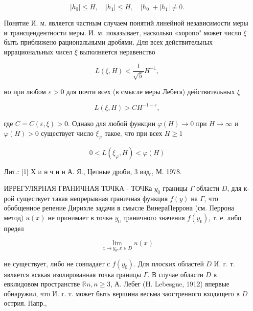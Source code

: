 \documentclass[10pt]{article}
\begin{document}
\[

\left|h_{0}\right| \leqslant H, \quad\left|h_{1}\right| \leqslant H, \quad\left|h_{0}\right|+\left|h_{1}\right| \neq 0 .

\]



Понятие И. м. является частным случаем понятий линейной независимости меры и трансцендентности меры. И. м. показывает, насколько «хоропо" может число $\xi$ быть приближено рациональными дробями. Для всех действительных иррациональных чисел $\xi$ выполняется неравенство



\[

L(\xi, H)<\frac{1}{\sqrt{5}} H^{-1},

\]



но при любом $\varepsilon>0$ для почти всех (в смысле меры Лебега) действительных $\xi$



\[

L(\xi, H)>C H^{-1-\varepsilon},

\]



где $C=C(\varepsilon, \xi)>0$. Однако для любой функции $\varphi(H) \rightarrow 0$ при $H \rightarrow \infty$ и $\varphi(H)>0$ существует число $\xi_{\varphi}$ такое, что при всех $H \geqslant 1$



\[

0<L\left(\xi_{\varphi}, H\right)<\varphi(H)

\]



Лит.: [1] Х и н ч и н А. Я., Цепные дроби, 3 изд., М. 1978.



ИРРЕГУЛЯРНАЯ ГРАНИЧНАЯ ТОЧКА - ТОЧКа $y_{0}$ границы $\Gamma$ области $D$, для к-рой существует такая непрерывная граничная функция $f(y)$ на $\Gamma$, что обобщенное репение Дирихле задачи в смысле ВинераПеррона (см. Перрона метод) $u(x)$ не принимает в точкө $y_{0}$ граничного значения $f\left(y_{0}\right)$, т. е. либо предел



\[

\lim _{x \rightarrow y_{0}, x \in D} u(x)

\]



не существует, либо не совпадает с $f\left(y_{0}\right)$. Для плоских областей $D$ И. г. т. является всякая изолированная точка границы $\Gamma$. В случае области $D$ в евклидовом пространстве $\mathbb{R} n, n \geqslant 3$, А. Лебег (H. Lebesgue, 1912) впервые обнаружил, что И. г. т. может быть вершина весьма заостренного входящего в $D$ острия. Напр.,
\end{document}
